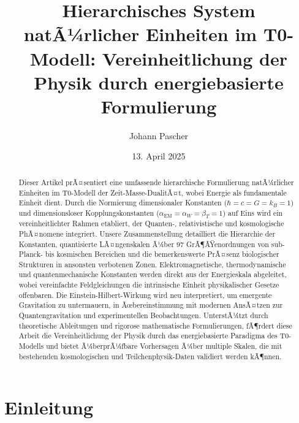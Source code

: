 ﻿\documentclass[twocolumn,aps,prl]{revtex4-2}
\begin{document}
	
	\title{Hierarchisches System natÃ¼rlicher Einheiten im T0-Modell: Vereinheitlichung der Physik durch energiebasierte Formulierung}
	\author{Johann Pascher}
	\date{13. April 2025}
	
	\begin{abstract}
		Dieser Artikel prÃ¤sentiert eine umfassende hierarchische Formulierung natÃ¼rlicher Einheiten im T0-Modell der Zeit-Masse-DualitÃ¤t, wobei Energie als fundamentale Einheit dient. Durch die Normierung dimensionaler Konstanten (\(\hbar = c = G = k_B = 1\)) und dimensionsloser Kopplungskonstanten (\(\alpha_{\text{EM}} = \alpha_W = \beta_T = 1\)) auf Eins wird ein vereinheitlichter Rahmen etabliert, der Quanten-, relativistische und kosmologische PhÃ¤nomene integriert. Unsere Zusammenstellung detailliert die Hierarchie der Konstanten, quantisierte LÃ¤ngenskalen Ã¼ber 97 GrÃ¶ÃŸenordnungen von sub-Planck- bis kosmischen Bereichen und die bemerkenswerte PrÃ¤senz biologischer Strukturen in ansonsten verbotenen Zonen. Elektromagnetische, thermodynamische und quantenmechanische Konstanten werden direkt aus der Energieskala abgeleitet, wobei vereinfachte Feldgleichungen die intrinsische Einheit physikalischer Gesetze offenbaren. Die Einstein-Hilbert-Wirkung wird neu interpretiert, um emergente Gravitation zu untermauern, in Ãœbereinstimmung mit modernen AnsÃ¤tzen zur Quantengravitation und experimentellen Beobachtungen. UnterstÃ¼tzt durch theoretische Ableitungen und rigorose mathematische Formulierungen, fÃ¶rdert diese Arbeit die Vereinheitlichung der Physik durch das energiebasierte Paradigma des T0-Modells und bietet Ã¼berprÃ¼fbare Vorhersagen Ã¼ber multiple Skalen, die mit bestehenden kosmologischen und Teilchenphysik-Daten validiert werden kÃ¶nnen.
	\end{abstract}
	
	\maketitle
	
	\section{Einleitung}
	\label{sec:introduction}
	
\end{document}
